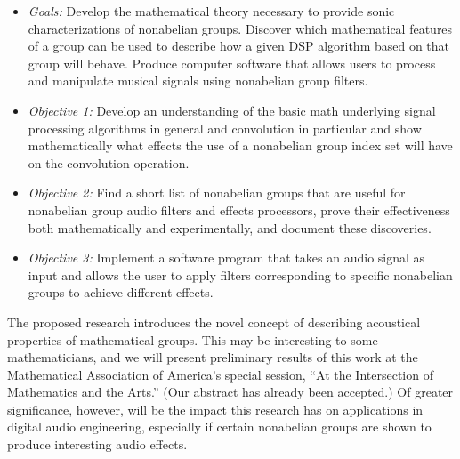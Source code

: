 \documentclass[10pt]{article}
\begin{document}
\begin{itemize}
\item {\it Goals:}
Develop the mathematical theory necessary to provide sonic characterizations of
nonabelian groups. Discover which mathematical features of a group can be used to
describe how a given DSP algorithm based on that group will behave. 
Produce computer software that allows users to process and manipulate musical
signals using nonabelian group filters.
\item 
{\it Objective 1:} Develop an understanding of the basic math underlying signal
processing algorithms in general and convolution in particular and show
mathematically what effects the use of a nonabelian group index set will have
on the convolution operation.
\item
{\it Objective 2:} Find a short list of nonabelian groups that are useful for
nonabelian group audio filters and effects processors, prove their effectiveness
both mathematically and experimentally, and document these discoveries.
\item
{\it Objective 3:} Implement a software program that takes an audio signal as input and
allows the user to apply filters corresponding to specific nonabelian groups to
achieve different effects. 
\end{itemize}

 
\vskip5mm

The proposed research introduces the novel concept of describing acoustical
properties of mathematical groups.  This may be interesting to some
mathematicians, and we will present preliminary results of this work at the
Mathematical Association of America's special session, ``At the Intersection of
Mathematics and the Arts.'' (Our  abstract has already been accepted.) 
Of greater significance, however, will be the impact this
research has on applications in digital audio engineering, especially if certain
nonabelian groups are shown to produce interesting audio effects.   
 
\end{document}
